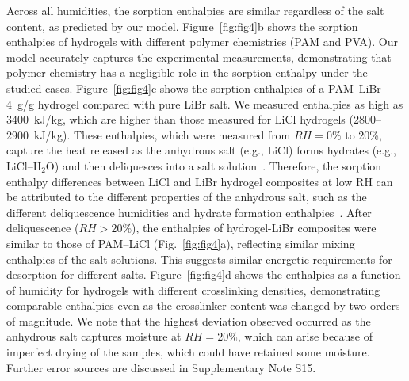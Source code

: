 \documentclass[11pt]{article}
\begin{document}
Across all humidities, the sorption enthalpies are similar regardless of the salt content, as predicted by our model. Figure~\ref{fig:fig4}b shows the sorption enthalpies of hydrogels with different polymer chemistries (PAM and PVA). Our model accurately captures the experimental measurements, demonstrating that polymer chemistry has a negligible role in the sorption enthalpy under the studied cases. Figure~\ref{fig:fig4}c shows the sorption enthalpies of a PAM--LiBr 4~g/g hydrogel compared with pure LiBr salt. We measured enthalpies as high as 3400~kJ/kg, which are higher than those measured for LiCl hydrogels (2800--2900~kJ/kg). These enthalpies, which were measured from $RH = 0\%$ to 20\%, capture the heat released as the anhydrous salt (e.g., LiCl) forms hydrates (e.g., LiCl--H$_2$O) and then deliquesces into a salt solution~\cite{xu2021}. Therefore, the sorption enthalpy differences between LiCl and LiBr hydrogel composites at low RH can be attributed to the different properties of the anhydrous salt, such as the different deliquescence humidities and hydrate formation enthalpies~\cite{conde2004,herold2016,greenspan1977}. After deliquescence ($RH > 20\%$), the enthalpies of hydrogel-LiBr composites were similar to those of PAM--LiCl (Fig.~\ref{fig:fig4}a), reflecting similar mixing enthalpies of the salt solutions. This suggests similar energetic requirements for desorption for different salts. Figure~\ref{fig:fig4}d shows the enthalpies as a function of humidity for hydrogels with different crosslinking densities, demonstrating comparable enthalpies even as the crosslinker content was changed by two orders of magnitude. We note that the highest deviation observed occurred as the anhydrous salt captures moisture at $RH = 20\%$, which can arise because of imperfect drying of the samples, which could have retained some moisture. Further error sources are discussed in Supplementary Note S15.
\end{document}
